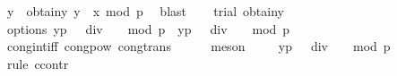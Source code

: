 \begin{isabellebody}
\ y\ \ obtain{\isacharunderscore}{\kern0pt}y{\isacharcolon}{\kern0pt}\ {\isachardoublequoteopen}{\isacharbrackleft}{\kern0pt}y{\isacharcircum}{\kern0pt}{}\ {\isacharequal}{\kern0pt}\ x{\isacharbrackright}{\kern0pt}\ {\isacharparenleft}{\kern0pt}mod\ p{\isacharparenright}{\kern0pt}{\isachardoublequoteclose}\ \isamarkupfalse%
\ blast\isanewline
\ \ \isamarkupfalse%
\ trial\ obtain{\isacharunderscore}{\kern0pt}y\ \isamarkupfalse%
\ options{\isacharcolon}{\kern0pt}\ {\isachardoublequoteopen}{\isacharbrackleft}{\kern0pt}{\isacharparenleft}{\kern0pt}y{\isacharcircum}{\kern0pt}{}{\isacharparenright}{\kern0pt}{\isacharcircum}{\kern0pt}{\isacharparenleft}{\kern0pt}{\isacharparenleft}{\kern0pt}p\ {\isacharminus}{\kern0pt}\ {}{\isacharparenright}{\kern0pt}\ div\ {}{\isacharparenright}{\kern0pt}\ {\isacharequal}{\kern0pt}\ {}{\isacharbrackright}{\kern0pt}\ {\isacharparenleft}{\kern0pt}mod\ p{\isacharparenright}{\kern0pt}\ {\isasymor}\ {\isacharbrackleft}{\kern0pt}{\isacharparenleft}{\kern0pt}y{\isacharcircum}{\kern0pt}{}{\isacharparenright}{\kern0pt}{\isacharcircum}{\kern0pt}{\isacharparenleft}{\kern0pt}{\isacharparenleft}{\kern0pt}p\ {\isacharminus}{\kern0pt}\ {}{\isacharparenright}{\kern0pt}\ div\ {}{\isacharparenright}{\kern0pt}\ {\isacharequal}{\kern0pt}\ {\isacharminus}{\kern0pt}{}{\isacharbrackright}{\kern0pt}\ {\isacharparenleft}{\kern0pt}mod\ p{\isacharparenright}{\kern0pt}{\isachardoublequoteclose}\isanewline
\ \ \isamarkupfalse%
\ cong{\isacharunderscore}{\kern0pt}int{\isacharunderscore}{\kern0pt}iff\ cong{\isacharunderscore}{\kern0pt}pow\ cong{\isacharunderscore}{\kern0pt}trans\isanewline
\ \ \ \ \isamarkupfalse%
\ {\isacharparenleft}{\kern0pt}meson{\isacharparenright}{\kern0pt}\isanewline
\ \ \isamarkupfalse%
\ {\isachardoublequoteopen}{\isasymnot}\ {\isacharbrackleft}{\kern0pt}{\isacharparenleft}{\kern0pt}y{\isacharcircum}{\kern0pt}{}{\isacharparenright}{\kern0pt}{\isacharcircum}{\kern0pt}{\isacharparenleft}{\kern0pt}{\isacharparenleft}{\kern0pt}p\ {\isacharminus}{\kern0pt}\ {}{\isacharparenright}{\kern0pt}\ div\ {}{\isacharparenright}{\kern0pt}\ {\isacharequal}{\kern0pt}\ {\isacharminus}{\kern0pt}{}{\isacharbrackright}{\kern0pt}\ {\isacharparenleft}{\kern0pt}mod\ p{\isacharparenright}{\kern0pt}{\isachardoublequoteclose}\ \isanewline
\ \ \isamarkupfalse%
\ {\isacharparenleft}{\kern0pt}rule\ ccontr{\isacharparenright}{\kern0pt}\isanewline

\end{isabellebody}
